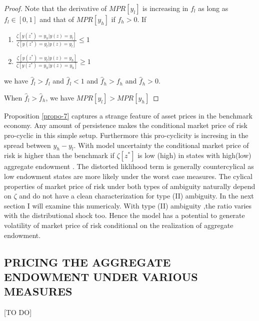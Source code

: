\documentclass[12pt]{article}
\begin{document}
\begin{proof}
Note that the derivative of $MPR[y_l]$ is increasing in $f_l$ as long as $f_l \in[0,1]$ and that of $MPR[y_h]$ if $f_h>0$. If \begin{enumerate}
	\item $\frac{\zeta[y(z^*)=y_h|y(z)=y_l]}{\zeta[y(z^*)=y_l|y(z)=y_l]} \leq 1$
	\item $\frac{\zeta[y(z^*)=y_l|y(z)=y_h]}{\zeta[y(z^*)=y_h|y(z)=y_h]} \geq 1$
\end{enumerate}
we have $\hat{f}_l > f_l$ and $\hat{f}_l <1$ and $\hat{f}_h > f_h$ and $\hat{f}_h > 0$.

When $\hat{f}_l > \hat{f}_h$, we have $MPR[y_l]>MPR[y_h]$ 
\end{proof}

Proposition \ref{propo-7} captures a strange feature of asset prices in the benchmark economy. Any amount of persistence makes the conditional market price of risk pro-cyclic in this simple setup. Furthermore this pro-cyclicity is incresing in the spread between $y_h-y_l$. With model uncertainty the conditional market price of risk is higher than the benchmark if $\zeta[z^*]$ is low (high) in states with high(low) aggregate endowment . The distorted liklihood term is generally countercylical as low endowment states are more likely under the worst case measures.  The cylical properties of market price of risk under both types of ambiguity naturally depend on $\zeta$ and do not have a clean characterization for type (II) ambiguity. In the next section I will examine this numericaly. With type (II) ambiguity ,the ratio varies with the distributional shock too. Hence the model has a potential to generate volatility of market price of risk conditional on the realization of aggregate endowment.
\subsection{PRICING THE AGGREGATE ENDOWMENT UNDER VARIOUS MEASURES}
[TO DO]
%
\end{document}
